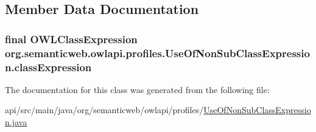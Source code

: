 \subsection{Member Data Documentation}
\hypertarget{classorg_1_1semanticweb_1_1owlapi_1_1profiles_1_1_use_of_non_sub_class_expression_a2904972a1c2a259d708005626ba9ff31}{
\subsubsection[{class\-Expression}]{\setlength{\rightskip}{0pt plus 5cm}final {\bf O\-W\-L\-Class\-Expression} org.\-semanticweb.\-owlapi.\-profiles.\-Use\-Of\-Non\-Sub\-Class\-Expression.\-class\-Expression\hspace{0.3cm}{\ttfamily [private]}}}\label{classorg_1_1semanticweb_1_1owlapi_1_1profiles_1_1_use_of_non_sub_class_expression_a2904972a1c2a259d708005626ba9ff31}


The documentation for this class was generated from the following file\-:\begin{DoxyCompactItemize}
\item 
api/src/main/java/org/semanticweb/owlapi/profiles/\hyperlink{_use_of_non_sub_class_expression_8java}{Use\-Of\-Non\-Sub\-Class\-Expression.\-java}\end{DoxyCompactItemize}
